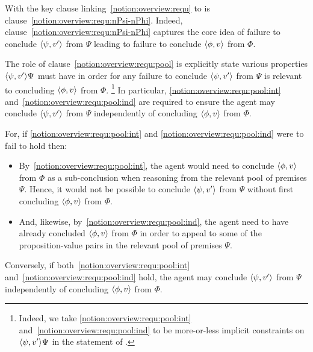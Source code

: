 \begin{note}
  With the key clause linking~\autoref{notion:overview:requ} to \qzs{} is clause~\ref{notion:overview:requ:nPsi-nPhi}.
  Indeed, clause~\ref{notion:overview:requ:nPsi-nPhi} captures the core idea of failure to conclude \(\langle \psi, v' \rangle\) from \(\Psi\) leading to failure to conclude \(\langle \phi, v \rangle\) from \(\Phi\).

  The role of clause~\ref{notion:overview:requ:pool} is explicitly state various properties \(\langle \psi, v' \rangle{\Psi}\) must have in order for any failure to conclude \(\langle \psi, v' \rangle\) from \(\Psi\) is relevant to concluding \(\langle \phi, v \rangle\) from \(\Phi\).%
  \footnote{
    Indeed, we take \ref{notion:overview:requ:pool:int} and~\ref{notion:overview:requ:pool:ind} to be more-or-less implicit constraints on \(\langle \psi, v' \rangle{\Psi}\) in the statement of \qzs{}.
  }
  In particular, \ref{notion:overview:requ:pool:int} and~\ref{notion:overview:requ:pool:ind} are required to ensure the agent may conclude \(\langle \psi, v' \rangle\) from \(\Psi\) independently of concluding \(\langle \phi, v \rangle\) from \(\Phi\).

    For, if \ref{notion:overview:requ:pool:int} and \ref{notion:overview:requ:pool:ind} were to fail to hold then:
  \begin{itemize}
  \item
    By~\ref{notion:overview:requ:pool:int}, the agent would need to conclude \(\langle \phi, v \rangle\) from \(\Phi\) as a sub-conclusion when reasoning from the relevant pool of premises \(\Psi\).
    Hence, it would not be possible to conclude \(\langle \psi, v' \rangle\) from \(\Psi\) without first concluding \(\langle \phi, v \rangle\) from \(\Phi\).
  \item
    And, likewise, by~\ref{notion:overview:requ:pool:ind}, the agent need to have already concluded \(\langle \phi, v \rangle\) from \(\Phi\) in order to appeal to some of the proposition-value pairs in the relevant pool of premises \(\Psi\).
  \end{itemize}

  Conversely, if both~\ref{notion:overview:requ:pool:int} and~\ref{notion:overview:requ:pool:ind} hold, the agent may conclude \(\langle \psi, v' \rangle\) from \(\Psi\) independently of concluding \(\langle \phi, v \rangle\) from \(\Phi\).


\end{note}
